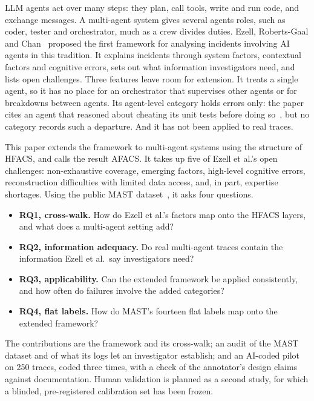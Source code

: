 \documentclass[10pt,a4paper]{article}
\begin{document}
LLM agents act over many steps: they plan, call tools, write and run code, and
exchange messages. A multi-agent system gives several agents roles, such as coder,
tester and orchestrator, much as a crew divides duties. Ezell, Roberts-Gaal and
Chan~\cite{ezell2025incident} proposed the first framework for analysing incidents
involving AI agents in this tradition. It explains incidents through system
factors, contextual factors and cognitive errors, sets out what information
investigators need, and lists open challenges. Three features leave room for
extension. It treats a single agent, so it has no place for an orchestrator that
supervises other agents or for breakdowns between agents. Its agent-level category
holds errors only: the paper cites an agent that reasoned about cheating its unit
tests before doing so~\cite{baker2025monitoring}, but no category records such a
departure. And it has not been applied to real traces.

This paper extends the framework to multi-agent systems using the structure of
HFACS, and calls the result AFACS. It takes up five of Ezell et al.'s open
challenges: non-exhaustive coverage, emerging factors, high-level cognitive
errors, reconstruction difficulties with limited data access, and, in part,
expertise shortages. Using the public MAST dataset~\cite{cemri2025mast}, it asks
four questions.
\begin{itemize}\setlength{\itemsep}{1pt}
  \item \textbf{RQ1, cross-walk.} How do Ezell et al.'s factors map onto the
  HFACS layers, and what does a multi-agent setting add?
  \item \textbf{RQ2, information adequacy.} Do real multi-agent traces contain the
  information Ezell et al.\ say investigators need?
  \item \textbf{RQ3, applicability.} Can the extended framework be applied
  consistently, and how often do failures involve the added categories?
  \item \textbf{RQ4, flat labels.} How do MAST's fourteen flat labels map onto the
  extended framework?
\end{itemize}
The contributions are the framework and its cross-walk; an audit of the MAST
dataset and of what its logs let an investigator establish; and an AI-coded pilot
on 250 traces, coded three times, with a check of the annotator's design claims
against documentation. Human validation is planned as a second study, for which a
blinded, pre-registered calibration set has been frozen.
\end{document}
